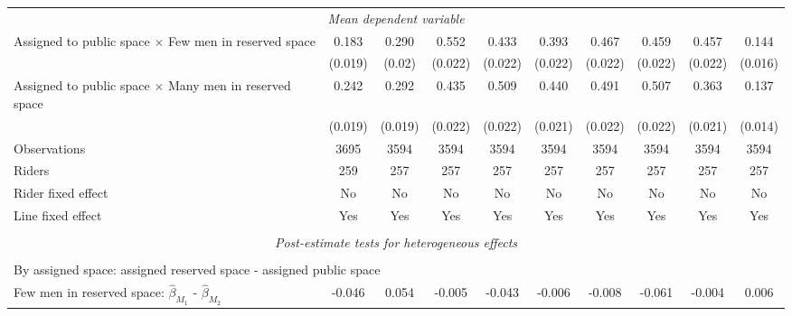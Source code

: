 \begin{tabular}{l*{9}{c}}
\multicolumn{10}{c}{\textit{Mean dependent variable}} \\ Assigned to public space $\times$ Few men in reserved space&       0.183         &       0.290         &       0.552         &       0.433         &       0.393         &       0.467         &       0.459         &       0.457         &       0.144         \\
\,                  &     (0.019)         &      (0.02)         &     (0.022)         &     (0.022)         &     (0.022)         &     (0.022)         &     (0.022)         &     (0.022)         &     (0.016)         \\
Assigned to public space $\times$ Many men in reserved space&       0.242         &       0.292         &       0.435         &       0.509         &       0.440         &       0.491         &       0.507         &       0.363         &       0.137         \\
\,                  &     (0.019)         &     (0.019)         &     (0.022)         &     (0.022)         &     (0.021)         &     (0.022)         &     (0.022)         &     (0.021)         &     (0.014)         \\
Observations        &        3695         &        3594         &        3594         &        3594         &        3594         &        3594         &        3594         &        3594         &        3594         \\
Riders              &         259         &         257         &         257         &         257         &         257         &         257         &         257         &         257         &         257         \\
Rider fixed effect  &          No         &          No         &          No         &          No         &          No         &          No         &          No         &          No         &          No         \\
Line fixed effect   &         Yes         &         Yes         &         Yes         &         Yes         &         Yes         &         Yes         &         Yes         &         Yes         &         Yes         \\
\hline \\[-1ex]  \multicolumn{10}{c}{\textit{Post-estimate tests for heterogeneous effects}} \\\\[-1ex] \multicolumn{10}{l}{By assigned space: assigned reserved space - assigned public space} \\ \quad Few men in reserved space: $\hat\beta_{M_1}$ - $\hat\beta_{M_2}$&      -0.046         &       0.054         &      -0.005         &      -0.043         &      -0.006         &      -0.008         &      -0.061         &      -0.004         &       0.006         \\

\end{tabular}

